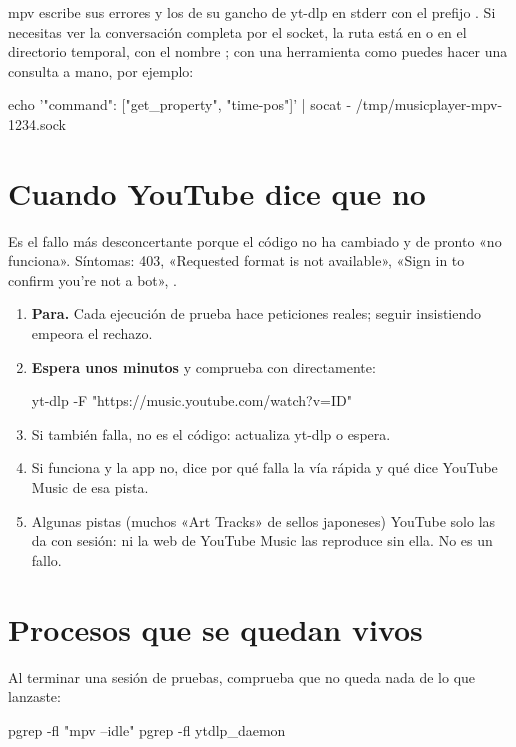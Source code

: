 mpv escribe sus errores y los de su gancho de yt-dlp en stderr con el prefijo .
Si necesitas ver la conversación completa por el socket, la ruta está en
 o en el directorio temporal, con el nombre ;
con una herramienta como  puedes hacer una consulta a mano, por ejemplo:

\begin{terminal}
echo '{"command": ["get_property", "time-pos"]}' | socat - /tmp/musicplayer-mpv-1234.sock
\end{terminal}

\section{Cuando YouTube dice que no}

Es el fallo más desconcertante porque el código no ha cambiado y de pronto «no funciona».
Síntomas: 403, «Requested format is not available», «Sign in to confirm you're not a bot»,
.

\begin{enumerate}
  \item \textbf{Para.} Cada ejecución de prueba hace peticiones reales; seguir insistiendo
  empeora el rechazo.
  \item \textbf{Espera unos minutos} y comprueba con  directamente:
\begin{terminal}
yt-dlp -F "https://music.youtube.com/watch?v=ID"
\end{terminal}
  \item Si  también falla, no es el código: actualiza yt-dlp o espera.
  \item Si  funciona y la app no,  dice por qué falla la
  vía rápida y  qué dice YouTube Music de esa pista.
  \item Algunas pistas (muchos «Art Tracks» de sellos japoneses) YouTube solo las da con
  sesión: ni la web de YouTube Music las reproduce sin ella. No es un fallo.
\end{enumerate}

\section{Procesos que se quedan vivos}

Al terminar una sesión de pruebas, comprueba que no queda nada de lo que lanzaste:

\begin{terminal}
pgrep -fl "mpv --idle"
pgrep -fl ytdlp_daemon
\end{terminal}

